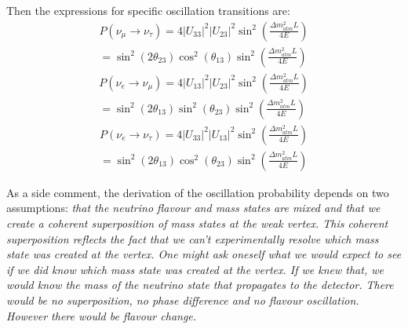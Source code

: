 Then the expressions for specific oscillation transitions are:
\begin{equation}
    \begin{gathered}
        P(\nu _\mu \to \nu _\tau) = 4\left|U_{33}\right|^2\left|U_{23}\right|^2\sin ^2\left(\frac{\Delta m^2 _{atm} L}{4E} \right)\\
        = \sin ^2 (2 \theta _{23})\cos ^2 (\theta _{13})\sin ^2\left(\frac{\Delta m^2 _{atm} L}{4E} \right)
    \end{gathered}
\end{equation}
\begin{equation}
    \begin{gathered}
        P(\nu _e \to \nu _\mu) = 4\left|U_{13}\right|^2\left|U_{23}\right|^2\sin ^2\left(\frac{\Delta m^2 _{atm} L}{4E} \right)\\
        = \sin ^2 (2 \theta _{13})\sin ^2 (\theta _{23})\sin ^2\left(\frac{\Delta m^2 _{atm} L}{4E} \right)
    \end{gathered}
\end{equation}
\begin{equation}
    \begin{gathered}
        P(\nu _e \to \nu _\tau) = 4\left|U_{33}\right|^2\left|U_{13}\right|^2\sin ^2\left(\frac{\Delta m^2 _{atm} L}{4E} \right)\\
        = \sin ^2 (2 \theta _{13})\cos^2 (\theta _{23})\sin ^2\left(\frac{\Delta m^2 _{atm} L}{4E} \right)
    \end{gathered}
\end{equation}

As a side comment, the derivation of the oscillation probability depends on two assumptions: \textit{that
the neutrino flavour and mass states are mixed and that we create a coherent superposition of mass
states at the weak vertex. This coherent superposition reflects the fact that we can’t experimentally
resolve which mass state was created at the vertex. One might ask oneself what we would expect
to see if we did know which mass state was created at the vertex. If we knew that, we would know
the mass of the neutrino state that propagates to the detector. There would be no superposition, no
phase difference and no flavour oscillation. However there would be flavour change.}

